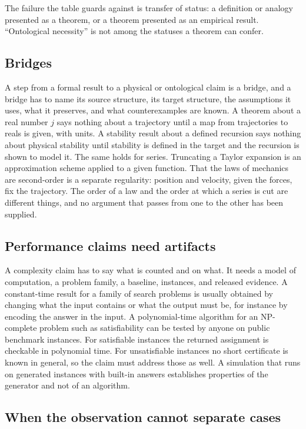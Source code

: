 \documentclass[11pt]{article}
\begin{document}
The failure the table guards against is transfer of status: a definition or analogy presented as a theorem, or a theorem presented as an empirical result. ``Ontological necessity'' is not among the statuses a theorem can confer.

\subsection{Bridges}

A step from a formal result to a physical or ontological claim is a bridge, and a bridge has to name its source structure, its target structure, the assumptions it uses, what it preserves, and what counterexamples are known. A theorem about a real number $j$ says nothing about a trajectory until a map from trajectories to reals is given, with units. A stability result about a defined recursion says nothing about physical stability until stability is defined in the target and the recursion is shown to model it. The same holds for series. Truncating a Taylor expansion is an approximation scheme applied to a given function. That the laws of mechanics are second-order is a separate regularity: position and velocity, given the forces, fix the trajectory. The order of a law and the order at which a series is cut are different things, and no argument that passes from one to the other has been supplied.

\subsection{Performance claims need artifacts}

A complexity claim has to say what is counted and on what. It needs a model of computation, a problem family, a baseline, instances, and released evidence. A constant-time result for a family of search problems is usually obtained by changing what the input contains or what the output must be, for instance by encoding the answer in the input. A polynomial-time algorithm for an NP-complete problem such as satisfiability can be tested by anyone on public benchmark instances. For satisfiable instances the returned assignment is checkable in polynomial time. For unsatisfiable instances no short certificate is known in general, so the claim must address those as well. A simulation that runs on generated instances with built-in answers establishes properties of the generator and not of an algorithm.

\subsection{When the observation cannot separate cases}
\end{document}
